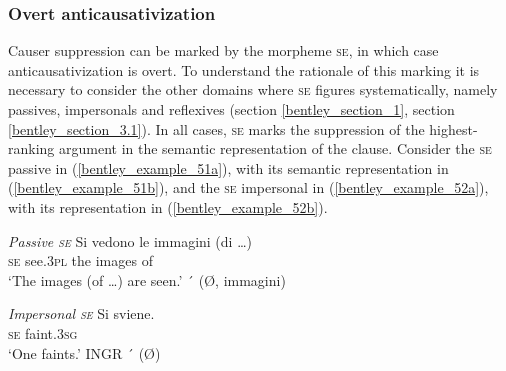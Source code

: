 \documentclass[output=paper,colorlinks,citecolor=brown
]{langscibook}
\begin{document}
\subsubsection{Overt anticausativization}
\label{bentley_section_5.4.1}
Causer suppression can be marked by the morpheme \textsc{se}, in which case anticausativization is overt. To understand the rationale of this marking it is necessary to consider the other domains where \textsc{se} figures systematically, namely passives, impersonals and reflexives (section \ref{bentley_section_1}, section \ref{bentley_section_3.1}). In all cases, \textsc{se} marks the suppression of the highest-ranking argument in the semantic representation of the clause. Consider the \textsc{se} passive in (\ref{bentley_example_51a}), with its semantic representation in (\ref{bentley_example_51b}), and the \textsc{se} impersonal in (\ref{bentley_example_52a}), with its representation in (\ref{bentley_example_52b}).

\ea \label{bentley_example_51}
    \textit{Passive \textsc{se}}
    \ea \label{bentley_example_51a}
    \gll Si		vedono	le		immagini (di \ldots ) \\
    \textsc{se}		see.3\textsc{pl}		the	images		of \\
    \glt 	‘The images (of \ldots ) are seen.’
    \ex \label{bentley_example_51b}
    ´ (Ø, immagini)
    \z
\z

\ea \label{bentley_example_52}
    \textit{Impersonal \textsc{se}}
    \ea \label{bentley_example_52a}
    \gll Si 	sviene.\\
    \textsc{se}		faint.3\textsc{sg}	 \\
    \glt 	‘One faints.’
    \ex \label{bentley_example_52b}
    INGR ´ (Ø)
    \z
\z
\end{document}
